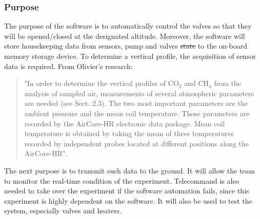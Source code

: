 \documentclass[a4paper,12pt,twoside]{article}
\providecommand{\DIFaddtex}[1]{{\protect\color{blue}\uwave{#1}}} %
\providecommand{\DIFdeltex}[1]{{\protect\color{red}\sout{#1}}}                      %
\providecommand{\DIFaddbegin}{} %
\providecommand{\DIFaddend}{} %
\providecommand{\DIFdelbegin}{} %
\providecommand{\DIFdelend}{} %
\providecommand{\DIFadd}[1]{\texorpdfstring{\DIFaddtex{#1}}{#1}} %
\providecommand{\DIFdel}[1]{\texorpdfstring{\DIFdeltex{#1}}{}} %
\newcommand{\DIFscaledelfig}{0.5}
\newlength{\DIFdelgraphicswidth} %
\newlength{\DIFdelgraphicsheight} %
\newcommand{\DIFaddincludegraphics}[2][]{{\color{blue}\fbox{\DIFOincludegraphics[#1]{#2}}}} %
\newcommand{\DIFdelincludegraphics}[2][]{%
\sbox{\DIFdelgraphicsbox}{\DIFOincludegraphics[#1]{#2}}%
\settoboxwidth{\DIFdelgraphicswidth}{\DIFdelgraphicsbox} %
\settoboxtotalheight{\DIFdelgraphicsheight}{\DIFdelgraphicsbox} %
\scalebox{\DIFscaledelfig}{%
\parbox[b]{\DIFdelgraphicswidth}{\usebox{\DIFdelgraphicsbox}\\[-\baselineskip] \rule{\DIFdelgraphicswidth}{0em}}\llap{\resizebox{\DIFdelgraphicswidth}{\DIFdelgraphicsheight}{%
\setlength{\unitlength}{\DIFdelgraphicswidth}%
\begin{picture}(1,1)%
\thicklines\linethickness{2pt} %
{\color[rgb]{1,0,0}\put(0,0){\framebox(1,1){}}}%
{\color[rgb]{1,0,0}\put(0,0){\line( 1,1){1}}}%
{\color[rgb]{1,0,0}\put(0,1){\line(1,-1){1}}}%
\end{picture}%
}\hspace*{3pt}}} %
} %
\DeclareRobustCommand{\DIFaddbegin}{\DIFOaddbegin \let\includegraphics\DIFaddincludegraphics} %
\DeclareRobustCommand{\DIFaddend}{\DIFOaddend \let\includegraphics\DIFOincludegraphics} %
\DeclareRobustCommand{\DIFdelbegin}{\DIFOdelbegin \let\includegraphics\DIFdelincludegraphics} %
\DeclareRobustCommand{\DIFdelend}{\DIFOaddend \let\includegraphics\DIFOincludegraphics} %
\begin{document}
\subsubsection{Purpose}
The purpose of the software is to automatically control the valves so that they will be opened/closed at the designated altitude. Moreover, the software will store housekeeping data from sensors, pump and valves \DIFdelbegin \DIFdel{state }\DIFdelend \DIFaddbegin \DIFadd{states }\DIFaddend to the on-board memory storage device. To determine a vertical profile, the acquisition of sensor data is required. From Olivier's research:
\begin{quote}
"In order to determine the vertical profiles of CO$_2$ and CH$_4$ from the analysis of sampled air, measurements of several atmospheric parameters are needed (see Sect. 2.3). The two most important parameters are the ambient pressure and the mean coil temperature. Those parameters are recorded by the AirCore-HR electronic data package. Mean coil temperature is obtained by taking the mean of three temperatures recorded by independent probes located at different positions along the AirCore-HR".\cite{Olivier}
\end{quote}
The next purpose is to transmit such data to the ground. It will allow the team to monitor the real-time condition of the experiment. Telecommand is also needed to take over the experiment if the software automation fails, since this experiment is highly dependent on the software. It will also be used to test the system, especially valves and heaters.\par
\end{document}

